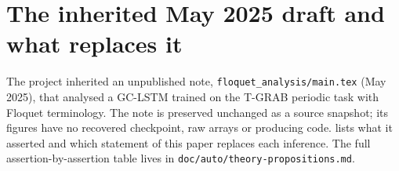 \section{The inherited May 2025 draft and what replaces it}
\label{app:inherited}

The project inherited an unpublished note, \texttt{floquet\_analysis/main.tex} (May 2025), that analysed a GC-LSTM trained on the T-GRAB periodic task with Floquet terminology. The note is preserved unchanged as a source snapshot; its figures have no recovered checkpoint, raw arrays or producing code.  lists what it asserted and which statement of this paper replaces each inference. The full assertion-by-assertion table lives in \texttt{doc/auto/theory-propositions.md}. 

